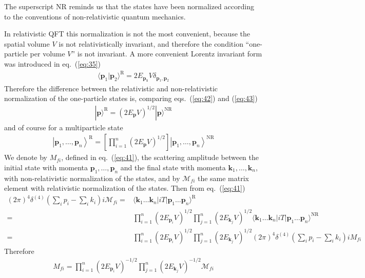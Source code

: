The superscript NR reminds us that the states have been normalized
according to the conventions of non-relativistic quantum mechanics.

In relativistic QFT this normalization is not the most convenient, because
the spatial volume $V$ is not relativistically invariant, and therefore
the condition  ``one-particle per volume $V$'' is not invariant. A more convenient Lorentz invariant form was introduced in eq.~(\ref{eq:35})
\begin{align}
  \label{eq:43}
     \langle\mathbf{p}_1 |\mathbf{p}_2\rangle^{\text{R}}=
   2E_\mathbf{p_1}V\delta_{{\mathbf{p}_1},{\mathbf{p}_2}}
\end{align}
Therefore the difference between the relativistic and non-relativistic normalization
of the one-particle states is, comparing eqs.~(\ref{eq:42}) and (\ref{eq:43})
\begin{align}
|\mathbf{p}\rangle^{\text{R}}=
   \left(2E_\mathbf{p}V\right)^{1/2}|\mathbf{p}\rangle^{\text{NR}}
\end{align}
and of course for a multiparticle state
\begin{align}
  \left|\mathbf{p}_1,\ldots,\mathbf{p}_n\right\rangle^{\text{R}}=
\left[\prod_{i=1}^{n}\left(2E_\mathbf{p}V\right)^{1/2}\right]
  \left|\mathbf{p}_1,\ldots,\mathbf{p}_n\right\rangle^{\text{NR}}
\end{align}
We denote by $M_{fi}$, defined in eq.~(\ref{eq:41}), the scattering amplitude between the initial state with
momenta $\mathbf{p}_1,\ldots,\mathbf{p}_n$ and the final state with momenta $\mathbf{k}_1,\ldots,\mathbf{k}_n$, with non-relativistic normalization of the states, and by $\mathcal{M}_{fi}$ the same matrix element with relativistic normalization of the states. Then from  eq.~(\ref{eq:41})
\begin{align}
(2\pi)^4\delta^{(4)}\left(\sum_i p_i-\sum_i k_i\right)i \mathcal{M}_{fi}=&\langle\mathbf{k}_1\ldots\mathbf{k}_n|i T|\mathbf{p}_1\ldots\mathbf{p}_n\rangle^{\text{R}}\nonumber\\
=&\prod_{i=1}^{n}\left(2E_{\mathbf{p}_i}V\right)^{1/2}
\prod_{j=1}^{n}\left(2E_{\mathbf{k}_j}V\right)^{1/2}\langle\mathbf{k}_1\ldots\mathbf{k}_n|i T|\mathbf{p}_1\ldots\mathbf{p}_n\rangle^{\text{NR}}\nonumber\\
=&\prod_{i=1}^{n}\left(2E_{\mathbf{p}_i}V\right)^{1/2}
\prod_{j=1}^{n}\left(2E_{\mathbf{k}_j}V\right)^{1/2}(2\pi)^4\delta^{(4)}\left(\sum_i p_i-\sum_i k_i\right)i {M}_{fi}
\end{align}
Therefore
\begin{align}
\label{eq:44}
  M_{fi}=\prod_{i=1}^{n}\left(2E_{\mathbf{p}_i}V\right)^{-1/2}
\prod_{j=1}^{n}\left(2E_{\mathbf{k}_j}V\right)^{-1/2}\mathcal{M}_{fi}
\end{align}

